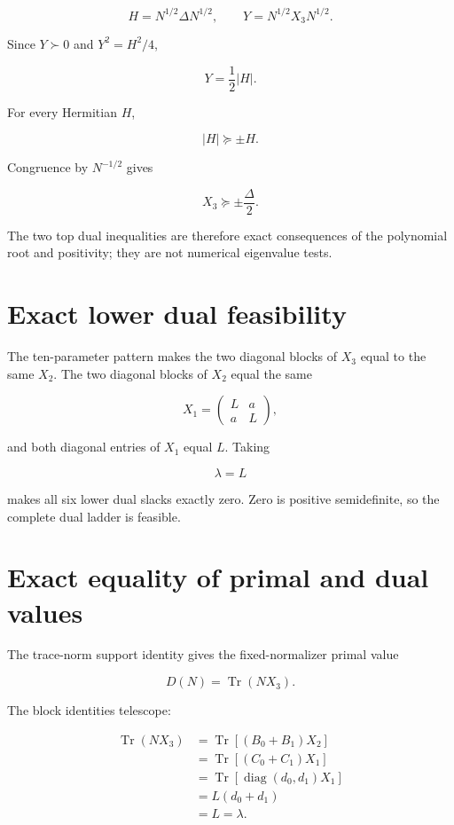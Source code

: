 \documentclass[11pt,a4paper,openany]{report}
\begin{document}
\[
H=N^{1/2}\Delta N^{1/2},
\qquad
Y=N^{1/2}X_3N^{1/2}.
\]

Since \(Y\succ0\) and \(Y^2=H^2/4\),

\[
Y=\frac12|H|.
\]

For every Hermitian \(H\),

\[
|H|\succeq\pm H.
\]

Congruence by \(N^{-1/2}\) gives

\[
\boxed{X_3\succeq\pm\frac{\Delta}{2}.}
\]

The two top dual inequalities are therefore exact consequences of the polynomial root and positivity; they are not numerical eigenvalue tests.

\section{Exact lower dual feasibility}

The ten-parameter pattern makes the two diagonal blocks of \(X_3\) equal to the same \(X_2\). The two diagonal blocks of \(X_2\) equal the same

\[
X_1=
\begin{pmatrix}
L&a\\
a&L
\end{pmatrix},
\]

and both diagonal entries of \(X_1\) equal \(L\). Taking

\[
\lambda=L
\]

makes all six lower dual slacks exactly zero. Zero is positive semidefinite, so the complete dual ladder is feasible.

\section{Exact equality of primal and dual values}

The trace-norm support identity gives the fixed-normalizer primal value

\[
D(N)=\operatorname{Tr}(NX_3).
\]

The block identities telescope:

\[
\begin{aligned}
\operatorname{Tr}(NX_3)
&=\operatorname{Tr}[(B_0+B_1)X_2]\\
&=\operatorname{Tr}[(C_0+C_1)X_1]\\
&=\operatorname{Tr}[\operatorname{diag}(d_0,d_1)X_1]\\
&=L(d_0+d_1)\\
&=L=\lambda.
\end{aligned}
\]
\end{document}
